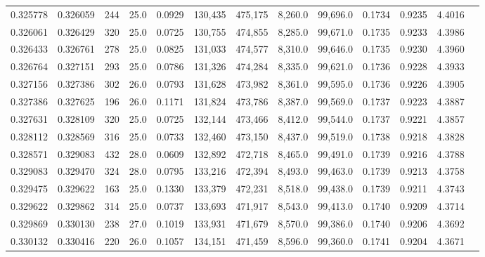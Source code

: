 \begin{tabular}{rrrrrrrrrrrrr}
0.325778 & 0.326059 &   244 & 25.0 &                                     0.0929 & 130,435 & 475,175 &   8,260.0 &  99,696.0 & 0.1734 & 0.9235 & 4.4016 \\
0.326061 & 0.326429 &   320 & 25.0 &                                     0.0725 & 130,755 & 474,855 &   8,285.0 &  99,671.0 & 0.1735 & 0.9233 & 4.3986 \\
0.326433 & 0.326761 &   278 & 25.0 &                                     0.0825 & 131,033 & 474,577 &   8,310.0 &  99,646.0 & 0.1735 & 0.9230 & 4.3960 \\
0.326764 & 0.327151 &   293 & 25.0 &                                     0.0786 & 131,326 & 474,284 &   8,335.0 &  99,621.0 & 0.1736 & 0.9228 & 4.3933 \\
0.327156 & 0.327386 &   302 & 26.0 &                                     0.0793 & 131,628 & 473,982 &   8,361.0 &  99,595.0 & 0.1736 & 0.9226 & 4.3905 \\
0.327386 & 0.327625 &   196 & 26.0 &                                     0.1171 & 131,824 & 473,786 &   8,387.0 &  99,569.0 & 0.1737 & 0.9223 & 4.3887 \\
0.327631 & 0.328109 &   320 & 25.0 &                                     0.0725 & 132,144 & 473,466 &   8,412.0 &  99,544.0 & 0.1737 & 0.9221 & 4.3857 \\
0.328112 & 0.328569 &   316 & 25.0 &                                     0.0733 & 132,460 & 473,150 &   8,437.0 &  99,519.0 & 0.1738 & 0.9218 & 4.3828 \\
0.328571 & 0.329083 &   432 & 28.0 &                                     0.0609 & 132,892 & 472,718 &   8,465.0 &  99,491.0 & 0.1739 & 0.9216 & 4.3788 \\
0.329083 & 0.329470 &   324 & 28.0 &                                     0.0795 & 133,216 & 472,394 &   8,493.0 &  99,463.0 & 0.1739 & 0.9213 & 4.3758 \\
0.329475 & 0.329622 &   163 & 25.0 &                                     0.1330 & 133,379 & 472,231 &   8,518.0 &  99,438.0 & 0.1739 & 0.9211 & 4.3743 \\
0.329622 & 0.329862 &   314 & 25.0 &                                     0.0737 & 133,693 & 471,917 &   8,543.0 &  99,413.0 & 0.1740 & 0.9209 & 4.3714 \\
0.329869 & 0.330130 &   238 & 27.0 &                                     0.1019 & 133,931 & 471,679 &   8,570.0 &  99,386.0 & 0.1740 & 0.9206 & 4.3692 \\
0.330132 & 0.330416 &   220 & 26.0 &                                     0.1057 & 134,151 & 471,459 &   8,596.0 &  99,360.0 & 0.1741 & 0.9204 & 4.3671 \\

\end{tabular}
